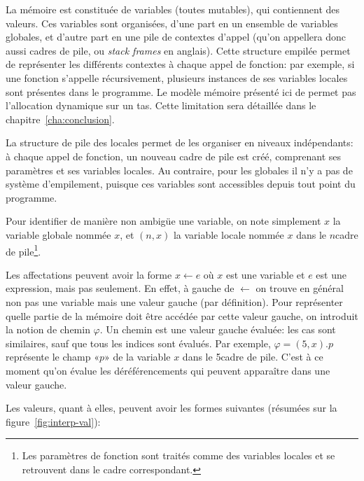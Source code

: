 La mémoire est constituée de variables (toutes mutables), qui contiennent des
valeurs. Ces variables sont organisées, d'une part en un ensemble de variables
globales, et d'autre part en une pile de contextes d'appel (qu'on appellera donc
aussi cadres de pile, ou \emph{stack frames} en anglais). Cette structure
empilée permet de représenter les différents contextes à chaque appel de
fonction: par exemple, si une fonction s'appelle récursivement, plusieurs
instances de ses variables locales sont présentes dans le programme. Le modèle
mémoire présenté ici de permet pas l'allocation dynamique sur un tas. Cette
limitation sera détaillée dans le chapitre~\ref{cha:conclusion}.

La structure de pile des locales permet de les organiser en niveaux
indépendants: à \linebreak chaque appel de fonction, un nouveau cadre de pile
est créé, comprenant ses paramètres et ses variables locales. Au contraire, pour
les globales il n'y a pas de système d'empilement, puisque ces variables sont
accessibles depuis tout point du programme.

Pour identifier de manière non ambigüe une variable, on note simplement $x$ la
variable globale nommée $x$, et $(n, x)$ la variable locale nommée $x$ dans le
$n$\ieme cadre de pile\footnote{Les paramètres de fonction sont traités comme
des variables locales et se retrouvent dans le cadre correspondant.}.

Les affectations peuvent avoir la forme $x ← e$ où $x$ est une variable et $e$
est une expression, mais pas seulement. En effet, à gauche de $←$ on trouve en
général non pas une variable mais une valeur gauche (par définition). Pour
représenter quelle partie de la mémoire doit être accédée par cette valeur
gauche, on introduit la notion de chemin $φ$. Un chemin est une valeur gauche
évaluée: les cas sont similaires, sauf que tous les indices sont évalués. Par
exemple, $φ = (5, x).p$ représente le champ «$p$» de la variable $x$ dans le
5\ieme cadre de pile. C'est à ce moment qu'on évalue les déréférencements qui
peuvent apparaître dans une valeur gauche.

Les valeurs, quant à elles, peuvent avoir les formes suivantes (résumées sur la
figure~\ref{fig:interp-val}):

